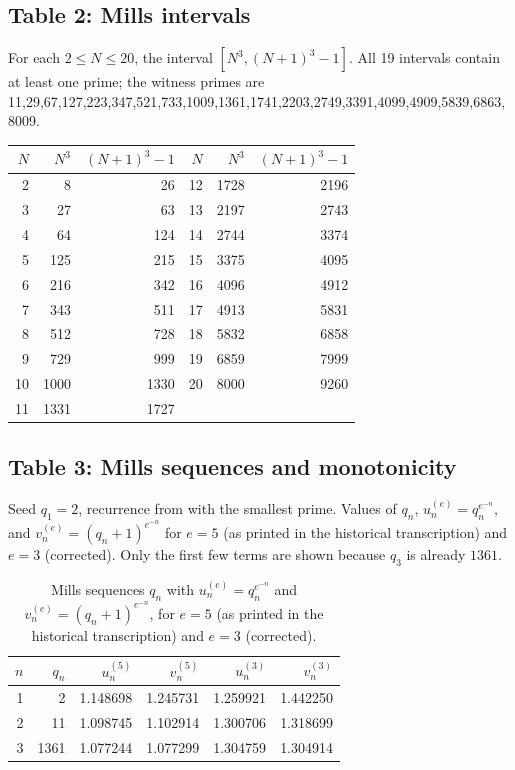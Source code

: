 \documentclass[11pt,reqno]{amsart}
\theoremstyle{redplain}
\numberwithin{equation}{section}
\begin{document}
\subsection{Table 2: Mills intervals}

For each $2\le N\le20$, the interval $[N^3,(N+1)^3-1]$. All 19 intervals
contain at least one prime; the witness primes are
11,29,67,127,223,347,521,733,1009,1361,1741,2203,2749,3391,4099,4909,5839,6863,8009.

\begin{center}
\begin{tabular}{rrr|rrr}
\toprule
$N$ & $N^3$ & $(N+1)^3-1$ & $N$ & $N^3$ & $(N+1)^3-1$\\
\midrule
2 & 8 & 26 & 12 & 1728 & 2196 \\
3 & 27 & 63 & 13 & 2197 & 2743 \\
4 & 64 & 124 & 14 & 2744 & 3374 \\
5 & 125 & 215 & 15 & 3375 & 4095 \\
6 & 216 & 342 & 16 & 4096 & 4912 \\
7 & 343 & 511 & 17 & 4913 & 5831 \\
8 & 512 & 728 & 18 & 5832 & 6858 \\
9 & 729 & 999 & 19 & 6859 & 7999 \\
10 & 1000 & 1330 & 20 & 8000 & 9260 \\
11 & 1331 & 1727 & & & \\
\bottomrule
\end{tabular}
\end{center}

\subsection{Table 3: Mills sequences and monotonicity}

Seed $q_1=2$, recurrence from  with the smallest
prime. Values of $q_n$, $u_n^{(e)}=q_n^{e^{-n}}$, and
$v_n^{(e)}=(q_n+1)^{e^{-n}}$ for $e=5$ (as printed in the historical
transcription) and $e=3$ (corrected). Only the first few terms are shown
because $q_3$ is already $1361$.

\begin{table}[H]
\centering
\begin{tabular}{rrrrrr}
\toprule
$n$ & $q_n$ & $u_n^{(5)}$ & $v_n^{(5)}$ & $u_n^{(3)}$ & $v_n^{(3)}$\\
\midrule
1 & 2    & 1.148698 & 1.245731 & 1.259921 & 1.442250 \\
2 & 11   & 1.098745 & 1.102914 & 1.300706 & 1.318699 \\
3 & 1361 & 1.077244 & 1.077299 & 1.304759 & 1.304914 \\
\bottomrule
\end{tabular}
\caption{Mills sequences $q_n$ with $u_n^{(e)}=q_n^{e^{-n}}$ and
$v_n^{(e)}=(q_n+1)^{e^{-n}}$, for $e=5$ (as printed in the historical
transcription) and $e=3$ (corrected).}
\label{tab:mills-mono}
\end{table}
\end{document}

